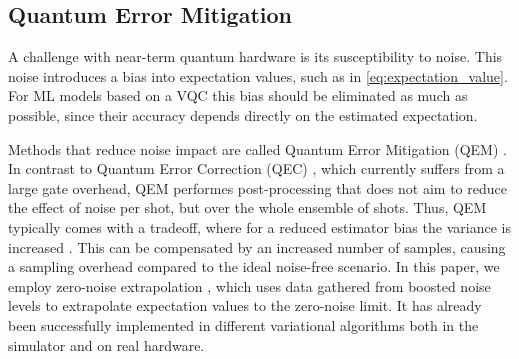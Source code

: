 \subsection{Quantum Error Mitigation}
\label{sec:error_mitigation}
A challenge with near-term quantum hardware is its susceptibility to noise. This noise introduces a bias into expectation values, such as in \cref{eq:expectation_value}. For ML models based on a VQC this bias should be eliminated as much as possible, since their accuracy depends directly on the estimated expectation. 

Methods that reduce noise impact are called Quantum Error Mitigation (QEM) \cite{Cai22}. In contrast to Quantum Error Correction (QEC) \cite{lidar2013qec}, which currently suffers from a large gate overhead, QEM performes post-processing that does not aim to reduce the effect of noise per shot, but over the whole ensemble of shots. Thus, QEM typically comes with a tradeoff, where for a reduced estimator bias the variance is increased \cite{Cai22}. This can be compensated by an increased number of samples, causing a sampling overhead compared to the ideal noise-free scenario.
In this paper, we employ zero-noise extrapolation \cite{temme2017error}, which uses data gathered from boosted noise levels to extrapolate expectation values to the zero-noise limit. It has already been successfully implemented in different variational algorithms \cite{kandala2019error, li2017efficient, dumitrescu2018cloud, kim2023scalable} both in the simulator and on real hardware.